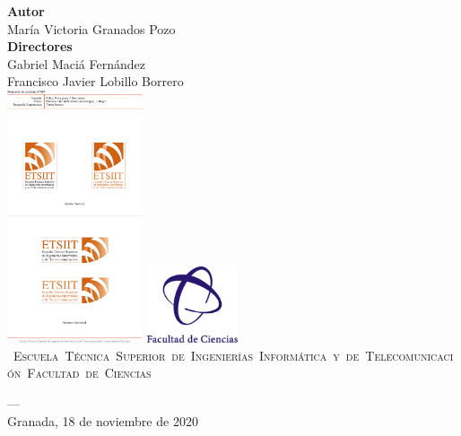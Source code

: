 \begin{titlepage}
\vspace{1.3cm}
\noindent\hspace*{\centeroffset}\begin{minipage}{\textwidth}
\centering

\textbf{Autor}\\ {María Victoria Granados Pozo}\\[2.5ex]
\textbf{Directores}\\
{Gabriel Maciá Fernández\\
Francisco Javier Lobillo Borrero 
}\\[1.8cm]

\includegraphics[width=0.3\textwidth]{portada/imagenes/logoEtsiit.pdf} \hfill \hfill \includegraphics[width=0.20\textwidth]{portada/imagenes/logoCiencias.png}\\[0.1cm]
\hbox{
	\vbox{
	  \hbox{\textsc{Escuela Técnica Superior de Ingenierías}}
	  \hbox{\textsc{Informática y de Telecomunicación}}
	}
	\hspace{1.6cm}
	\textsc{Facultad de Ciencias}
}

\vspace{1.4cm}

\textsc{---}\\
Granada, 18 de noviembre de 2020
\end{minipage}
\end{titlepage}


